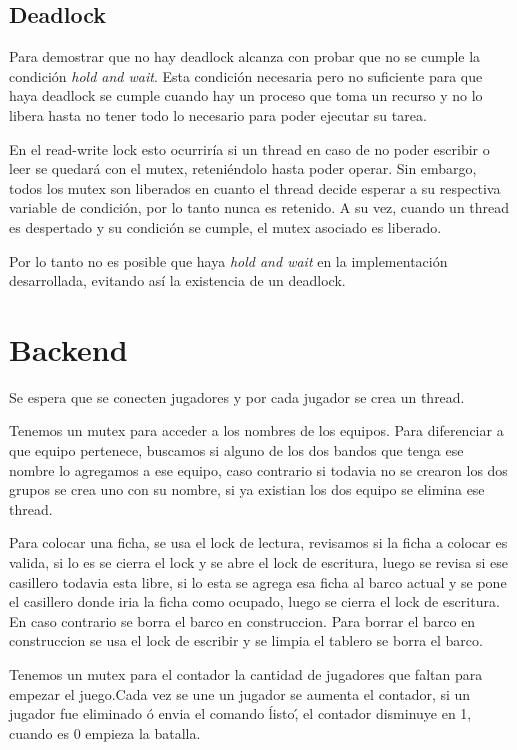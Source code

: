 \documentclass[a4paper]{article}
\begin{document}
\subsection{Deadlock}

Para demostrar que no hay deadlock alcanza con probar que no se cumple la
condición \emph{hold and wait}. Esta condición necesaria pero no suficiente para
que haya deadlock se cumple cuando hay un proceso que toma un recurso y no lo
libera hasta no tener todo lo necesario para poder ejecutar su tarea.

En el read-write lock esto ocurriría si un thread en caso de no poder escribir o
leer se quedará con el mutex, reteniéndolo hasta poder operar. Sin embargo,
todos los mutex son liberados en cuanto el thread decide esperar a su respectiva
variable de condición, por lo tanto nunca es retenido. A su vez, cuando un
thread es despertado y su condición se cumple, el mutex asociado es liberado.

Por lo tanto no es posible que haya \emph{hold and wait} en la implementación
desarrollada, evitando así la existencia de un deadlock.

\section{Backend}
Se espera que se conecten jugadores y por cada jugador se crea un thread.

Tenemos un mutex para acceder a los nombres de los equipos. Para diferenciar a
que equipo pertenece,  buscamos si alguno de los dos bandos que tenga ese nombre
lo agregamos a ese equipo, caso contrario si todavia no se crearon los dos
grupos se crea uno con su nombre, si ya existian los dos equipo se elimina ese
thread.

Para colocar una ficha, se usa el lock de lectura, revisamos si la ficha a
colocar es valida, si lo es se cierra el lock y se abre el lock de escritura,
luego se revisa si ese casillero todavia esta libre, si lo esta se agrega esa
ficha al barco actual y se pone el casillero donde iria la ficha como ocupado,
luego se cierra el lock de escritura. En caso contrario se borra el barco en
construccion.  Para borrar el barco en construccion se usa el lock de escribir y
se limpia el tablero se borra el barco.

Tenemos un mutex para el contador la cantidad de jugadores que faltan para
empezar el juego.Cada vez se une un jugador se aumenta el contador, si un
jugador fue eliminado ó envia el comando \'listo\', el contador disminuye en 1,
cuando  es $0$ empieza la batalla.
\end{document}

